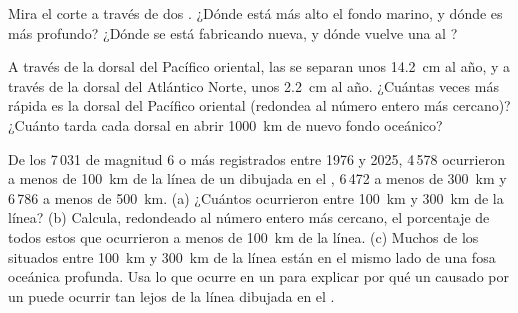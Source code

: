 \begin{exercise}[$\star\star$]\label{exo:g7:plate-tectonics:10}
Mira el corte a través de dos . ¿Dónde está más alto el
fondo marino, y dónde es más profundo? ¿Dónde se está fabricando 
nueva, y dónde vuelve una  al ?
\end{exercise}

\begin{exercise}[$\star\star\star$]\label{exo:g7:plate-tectonics:11}
A través de la dorsal del Pacífico oriental, las  se separan unos
\qty{14.2}{cm} al año, y a través de la dorsal del Atlántico Norte, unos
\qty{2.2}{cm} al año. ¿Cuántas veces más rápida es la dorsal del Pacífico
oriental (redondea al número entero más cercano)? ¿Cuánto tarda cada dorsal
en abrir \qty{1000}{km} de nuevo fondo oceánico?
\end{exercise}

\begin{exercise}[$\star\star\star$]\label{exo:g7:plate-tectonics:12}
De los 7\,031  de magnitud 6 o más registrados entre 1976 y 2025,
4\,578 ocurrieron a menos de \qty{100}{km} de la línea de un  dibujada en el , 6\,472 a menos de \qty{300}{km} y 6\,786 a
menos de \qty{500}{km}.
(a) ¿Cuántos ocurrieron entre \qty{100}{km} y \qty{300}{km} de la línea?
(b) Calcula, redondeado al número entero más cercano, el porcentaje de
todos estos  que ocurrieron a menos de \qty{100}{km} de la línea.
(c) Muchos de los  situados entre \qty{100}{km} y \qty{300}{km}
de la línea están en el mismo lado de una fosa oceánica profunda. Usa lo
que ocurre en un  para explicar por qué un 
causado por un  puede ocurrir tan lejos de la línea
dibujada en el .
\end{exercise}

